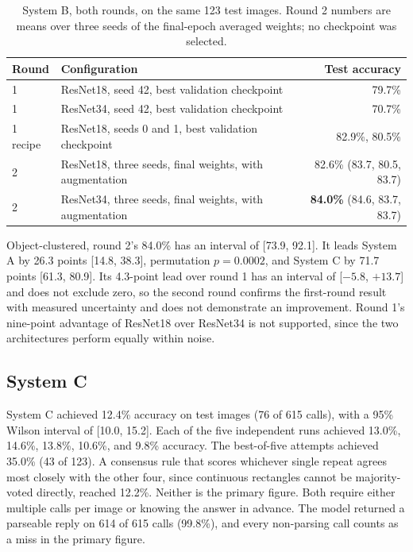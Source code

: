 \documentclass[12pt,letterpaper]{article}
\begin{document}
\begin{table}[H]
\centering
\caption{System B, both rounds, on the same 123 test images. Round 2
numbers are means over three seeds of the final-epoch averaged weights;
no checkpoint was selected.}
\label{tab:round2}
\begin{tabular}{llr}
\toprule
Round & Configuration & Test accuracy \\
\midrule
1 & ResNet18, seed 42, best validation checkpoint & 79.7\% \\
1 & ResNet34, seed 42, best validation checkpoint & 70.7\% \\
1 recipe & ResNet18, seeds 0 and 1, best validation checkpoint & 82.9\%, 80.5\% \\
2 & ResNet18, three seeds, final weights, with augmentation & 82.6\% (83.7, 80.5, 83.7) \\
2 & ResNet34, three seeds, final weights, with augmentation & \textbf{84.0\%} (84.6, 83.7, 83.7) \\
\bottomrule
\end{tabular}
\end{table}

Object-clustered, round 2's 84.0\% has an interval of [73.9, 92.1]. It
leads System A by 26.3 points [14.8, 38.3], permutation $p = 0.0002$,
and System C by 71.7 points [61.3, 80.9]. Its 4.3-point lead over round
1 has an interval of [$-5.8$, $+13.7$] and does not exclude zero, so the
second round confirms the first-round result with measured uncertainty
and does not demonstrate an improvement. Round 1's nine-point advantage
of ResNet18 over ResNet34 is not supported, since the two architectures
perform equally within noise.

\subsection{System C}

System C achieved 12.4\% accuracy on test images (76 of 615 calls), with
a 95\% Wilson interval of [10.0, 15.2]. Each of the five independent
runs achieved 13.0\%, 14.6\%, 13.8\%, 10.6\%, and 9.8\% accuracy. The
best-of-five attempts achieved 35.0\% (43 of 123). A consensus rule that
scores whichever single repeat agrees most closely with the other four,
since continuous rectangles cannot be majority-voted directly, reached
12.2\%. Neither is the primary figure. Both require either multiple
calls per image or knowing the answer in advance. The model returned a
parseable reply on 614 of 615 calls (99.8\%), and every non-parsing call
counts as a miss in the primary figure.
\end{document}
